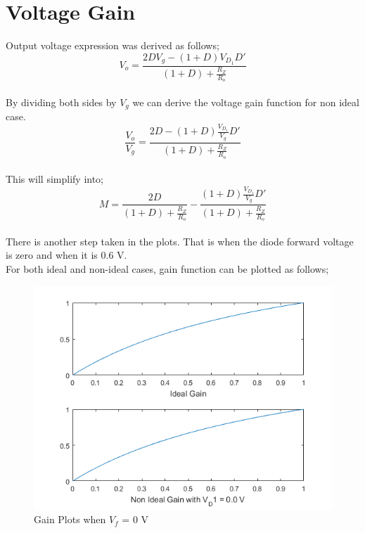 \documentclass[12pt]{article}
\begin{document}
\section{Voltage Gain}

Output voltage expression was derived as follows;
\begin{equation*}
V_o = \frac{2DV_g-(1+D)V_{D_1}D'}{(1+D)+\frac{R_Z}{R_o}}
\end{equation*}\\
By dividing both sides by $V_g$ we can derive the voltage gain function for non ideal case.
\begin{equation*}
\frac{V_o}{V_g} = \frac{2D-(1+D)\frac{V_{D_1}}{V_g}D'}{(1+D)+\frac{R_Z}{R_o}}
\end{equation*}\\
This will simplify into;
\begin{equation*}
M = \frac{2D}{(1+D)+\frac{R_Z}{R_o}} - \frac{(1+D)\frac{V_{D_1}}{V_g}D'}{(1+D)+\frac{R_Z}{R_o}}
\end{equation*}\\
There is another step taken in the plots. That is when the diode forward voltage is zero and when it is 0.6 V.
\\

For both ideal and non-ideal cases, gain function can be plotted as follows;

\begin{figure}[!h]
\caption{Gain Plots when $V_f$ = 0 V}
\centering
\includegraphics[scale=0.8]{images/gain_ovd.png}
\end{figure}
\end{document}

